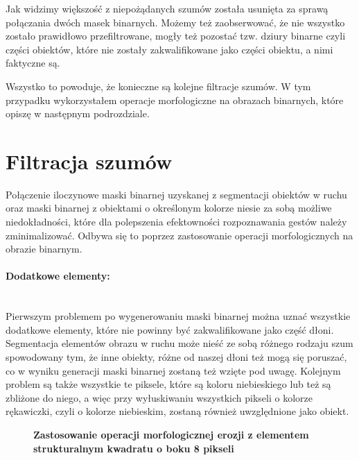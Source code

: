 \documentclass[a4paper,12pt,twoside,openany]{report}
\newcommand{\ImgPath}{.}
\begin{document}
Jak widzimy większość z niepożądanych szumów została usunięta za sprawą połączania dwóch masek binarnych. Możemy też zaobserwować, że nie wszystko zostało prawidłowo przefiltrowane, mogły też pozostać tzw. dziury binarne czyli części obiektów, które nie zostały zakwalifikowane jako części obiektu, a nimi faktyczne są. 

Wszystko to powoduje, że konieczne są kolejne filtracje szumów. W tym przypadku wykorzystałem operacje morfologiczne na obrazach binarnych, które opiszę w następnym podrozdziale.  

\section{Filtracja szumów}
Połączenie iloczynowe maski binarnej uzyskanej z segmentacji obiektów w ruchu oraz maski binarnej z obiektami o określonym kolorze niesie za sobą możliwe niedokładności, które dla polepszenia efektowności rozpoznawania gestów należy zminimalizować. Odbywa się to poprzez zastosowanie operacji morfologicznych na obrazie binarnym. 

\paragraph{Dodatkowe elementy:} \mbox{} \\
\indent
Pierwszym problemem po wygenerowaniu maski binarnej można uznać wszystkie dodatkowe elementy, które nie powinny być zakwalifikowane jako część dłoni. Segmentacja elementów obrazu w ruchu może nieść ze sobą różnego rodzaju szum spowodowany tym, że inne obiekty, różne od naszej dłoni też mogą się poruszać, co w wyniku generacji maski binarnej zostaną też wzięte pod uwagę. Kolejnym problem są także wszystkie te piksele, które są koloru niebieskiego lub też są zbliżone do niego, a więc przy wyłuskiwaniu wszystkich pikseli o kolorze rękawiczki, czyli o kolorze niebieskim, zostaną również uwzględnione jako obiekt.

\begin{figure}[H]
	\centering
	\caption{  \textbf{Zastosowanie operacji morfologicznej erozji z elementem strukturalnym kwadratu o boku 8 pikseli}}
\end{figure}
\end{document}
